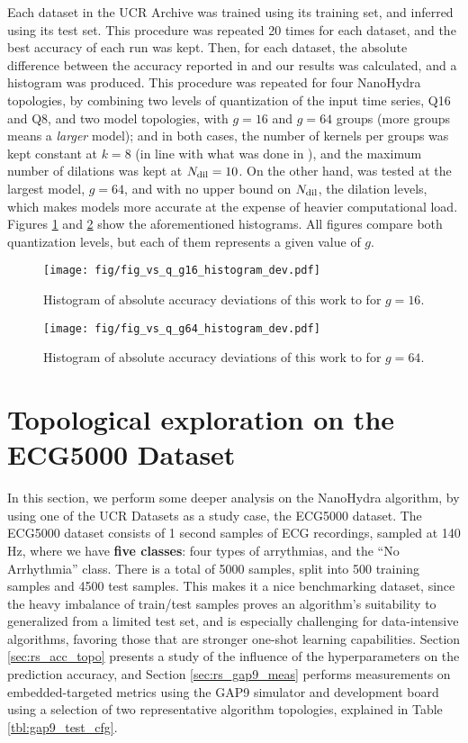 Each dataset in the UCR Archive was trained using its training set, and inferred using its test set. This procedure was repeated 20 times for each dataset, and the best accuracy of each run was kept.
Then, for each dataset, the absolute difference between the accuracy reported in \cite{Dempster2023Hydra} and our results was calculated, and a histogram was produced. This procedure was repeated for four NanoHydra topologies,
by combining two levels of quantization of the input time series, Q16 and Q8, and two model topologies, with $g=16$ and $g=64$ groups (more groups means a \emph{larger} model); and in both cases, the number of kernels per groups
was kept constant at $k=8$ (in line with what was done in \cite{Dempster2023Hydra}), and the maximum number of dilations was kept at $N\sb{\text{dil}}=10$. 
On the other hand, \cite{Dempster2023Hydra} was tested at the largest model, $g=64$, and with no upper bound on $N\sb{\text{dil}}$, the dilation levels, which makes models more accurate at the expense of heavier computational load.
Figures \ref{fig:ucr_hist_vs_q_g16} and \ref{fig:ucr_hist_vs_q_g64} show the aforementioned histograms. All figures compare both quantization levels, but each of them represents a given value of $g$.

\begin{figure}[h!]
    \centerfloat
    \texttt{[image: fig/fig\_vs\_q\_g16\_histogram\_dev.pdf]}
    \caption{Histogram of absolute accuracy deviations of this work to \cite{Dempster2023Hydra} for $g=16$.}
    \label{fig:ucr_hist_vs_q_g16}
\end{figure}
\begin{figure}[h!]
    \centerfloat
    \texttt{[image: fig/fig\_vs\_q\_g64\_histogram\_dev.pdf]}
    \caption{Histogram of absolute accuracy deviations of this work to \cite{Dempster2023Hydra} for $g=64$.}
    \label{fig:ucr_hist_vs_q_g64}
\end{figure}

\section{Topological exploration on the ECG5000 Dataset}\label{sec:rs_arch_ecg5000}
In this section, we perform some deeper analysis on the NanoHydra algorithm, by using one of the UCR Datasets as a study case, the ECG5000 dataset.
The ECG5000 dataset consists of 1 second samples of ECG recordings, sampled at 140 Hz, where we have \textbf{five classes}: four types of arrythmias, and the ``No Arrhythmia'' class.
There is a total of 5000 samples, split into 500 training samples and 4500 test samples. This makes it a nice benchmarking dataset, since the heavy imbalance of train/test samples proves an
algorithm's suitability to generalized from a limited test set, and is especially challenging for data-intensive algorithms, favoring those that are stronger one-shot learning capabilities.
Section \ref{sec:rs_acc_topo} presents a study of the influence of the hyperparameters on the prediction accuracy, and Section \ref{sec:rs_gap9_meas} performs
measurements on embedded-targeted metrics using the GAP9 simulator and development board using a selection of two representative algorithm topologies, explained in Table \ref{tbl:gap9_test_cfg}.

